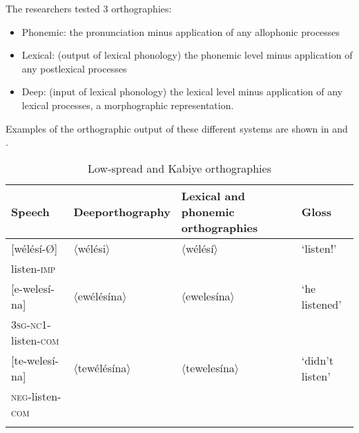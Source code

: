 \documentclass[output=paper]{langscibook}
\begin{document}
The researchers tested 3 orthographies:

\begin{itemize}
    \item Phonemic: the pronunciation minus application of any allophonic processes
    \item Lexical: (output of lexical phonology) the phonemic level minus application of any postlexical processes
    \item Deep: (input of lexical phonology) the lexical level minus application of any lexical processes, a morphographic representation.
\end{itemize}

Examples of the orthographic output of these different systems are shown in  and . 

\begin{table}
    \begin{tabularx}{\textwidth}{lXQl}
        \lsptoprule
         Speech       & Deep\newline orthography  & Lexical and phonemic orthographies & Gloss\\\midrule
        {[wélésí-Ø]} & 〈wélési〉 & 〈wélésí〉 & ‘listen!’\\
        listen-\textsc{imp} &          &          &          \\
        {[e-welesí-na]}       & 〈ewélésína〉 & 〈ewelesína〉 & ‘he listened’\\
        \textsc{3sg-nc1}-listen-\textsc{com}   &             &             &               \\
        {[te-welesí-na]} & 〈tewélésína〉 & 〈tewelesína〉 & ‘didn’t listen’\\
        \textsc{neg}-listen-\textsc{com} &                &               &               \\
        \lspbottomrule
    \end{tabularx}
    \caption{Low-spread and Kabiye orthographies}
    \label{tab:cahill:19}
\end{table}

\end{document}
